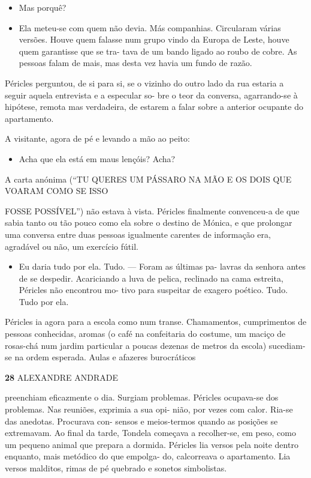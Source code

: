 \begin{itemize}
\tightlist
\item
  Mas porquê?
\item
  Ela meteu-se com quem não devia. Más companhias. Circularam várias
  versões. Houve quem falasse num grupo vindo da Europa de Leste, houve
  quem garantisse que se tra- tava de um bando ligado ao roubo de cobre.
  As pessoas falam de mais, mas desta vez havia um fundo de razão.
\end{itemize}

Péricles perguntou, de si para si, se o vizinho do outro lado da rua
estaria a seguir aquela entrevista e a especular so- bre o teor da
conversa, agarrando-se à hipótese, remota mas verdadeira, de estarem a
falar sobre a anterior ocupante do apartamento.

A visitante, agora de pé e levando a mão ao peito:

\begin{itemize}
\tightlist
\item
  Acha que ela está em maus lençóis? Acha?
\end{itemize}

A carta anónima (``TU QUERES UM PÁSSARO NA MÃO E OS DOIS QUE VOARAM COMO
SE ISSO

FOSSE POSSÍVEL'') não estava à vista. Péricles finalmente convenceu-a de
que sabia tanto ou tão pouco como ela sobre o destino de Mónica, e que
prolongar uma conversa entre duas pessoas igualmente carentes de
informação era, agradável ou não, um exercício fútil.

\begin{itemize}
\tightlist
\item
  Eu daria tudo por ela. Tudo. --- Foram as últimas pa- lavras da
  senhora antes de se despedir. Acariciando a luva de pelica, reclinado
  na cama estreita, Péricles não encontrou mo- tivo para suspeitar de
  exagero poético. Tudo. Tudo por ela.
\end{itemize}

Péricles ia agora para a escola como num transe. Chamamentos,
cumprimentos de pessoas conhecidas, aromas (o café na confeitaria do
costume, um maciço de rosas-chá num jardim particular a poucas dezenas
de metros da escola) sucediam-se na ordem esperada. Aulas e afazeres
burocráticos

\textbf{28 }ALEXANDRE ANDRADE

preenchiam eficazmente o dia. Surgiam problemas. Péricles ocupava-se dos
problemas. Nas reuniões, exprimia a sua opi- nião, por vezes com calor.
Ria-se das anedotas. Procurava con- sensos e meios-termos quando as
posições se extremavam. Ao final da tarde, Tondela começava a
recolher-se, em peso, como um pequeno animal que prepara a dormida.
Péricles lia versos pela noite dentro enquanto, mais metódico do que
empolga- do, calcorreava o apartamento. Lia versos malditos, rimas de pé
quebrado e sonetos simbolistas.

